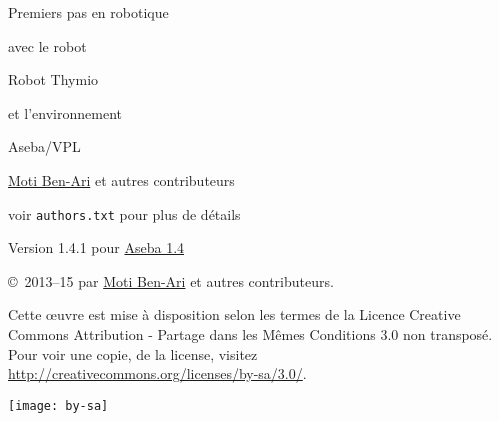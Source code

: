\thispagestyle{empty}

\begin{center}
\begin{Huge}
\begin{bfseries}
Premiers pas en robotique
\end{bfseries}

avec le robot

\begin{bfseries}
Robot Thymio
\end{bfseries}

et l'environnement

\begin{bfseries}
Aseba/VPL
\end{bfseries}

\end{Huge}

\vskip 2cm

\begin{LARGE}
\href{http://www.weizmann.ac.il/sci-tea/benari/}{Moti Ben-Ari} et autres contributeurs\\
\end{LARGE}
\bigskip
\begin{Large}
voir \texttt{authors.txt} pour plus de détails
\end{Large}

\vskip 1cm

\begin{Large}
Version 1.4.1 pour \href{https://aseba.wikidot.com/fr:downloadinstall}{Aseba 1.4}
\end{Large}

\end{center}

\vfill

\begin{center}
\copyright{}\  2013--15 par \href{http://www.weizmann.ac.il/sci-tea/benari/}{Moti Ben-Ari} et autres contributeurs.
\end{center}

Cette œuvre est mise à disposition selon les termes de la Licence Creative Commons Attribution - Partage dans les Mêmes Conditions 3.0 non transposé.
Pour voir une copie, de la license, visitez \href{http://creativecommons.org/licenses/by-sa/3.0/deed.fr}{http://creativecommons.org/licenses/by-sa/3.0/}.

\begin{center}
\texttt{[image: by-sa]}
\end{center}

\newpage
\begin{spacing}{0.7}
\tableofcontents
\end{spacing}
\thispagestyle{empty}
\newpage
\setcounter{page}{1}
